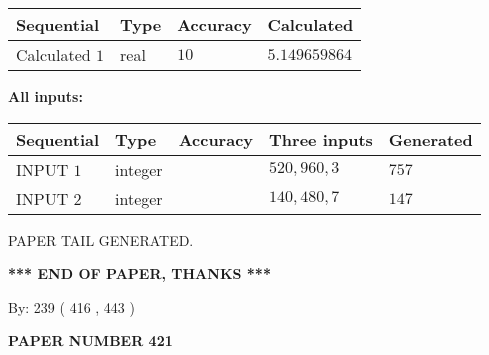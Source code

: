 \documentclass{ctexart}
\begin{document}
   
   
   
\noindent{}
   
   
  
  
\noindent\begin{tabular}{|l|l|l|l|}
\hline
 Sequential & Type & Accuracy & Calculated \\ 
\hline
 
 
  Calculated $  1 $ & real & $  10  $ & 
 $ 5.149659864 $ 
 \\  \hline  
 \end{tabular}
   
   
   
   
\noindent\vspace{0.1in}\hspace{-0.08in} {\textbf{\Large{All inputs: }}}
   
   
  
  
\noindent\begin{tabular}{|l|l|l|l|l|}
\hline
 Sequential & Type & Accuracy & Three inputs & Generated \\ 
\hline
 
 
  INPUT $  1 $ & integer &  & $
 520
 , 
 960
 , 
 3
 $ & $ 757 $ 
 \\  \hline  
 
 
  INPUT $  2 $ & integer &  & $
 140
 , 
 480
 , 
 7
 $ & $ 147 $ 
 \\  \hline  
 \end{tabular}
   
   
   
   
   
   
 \vspace{0.2in}
 
   
   
\vspace{2.0in} PAPER TAIL GENERATED.
   
   
   
   
\vspace{1.0in} 
{\textbf{\large{ *** END OF PAPER, THANKS *** }}} 
   
   
\hspace{1.0in} By: 
 239 ( 416 ,  443 )
   
   
   
   
\newpage 
\setcounter{page}{ 
   421001 } 
   
   
   
   
 {\textbf{ \Large{ PAPER NUMBER  421  }}}
   
\end{document}
